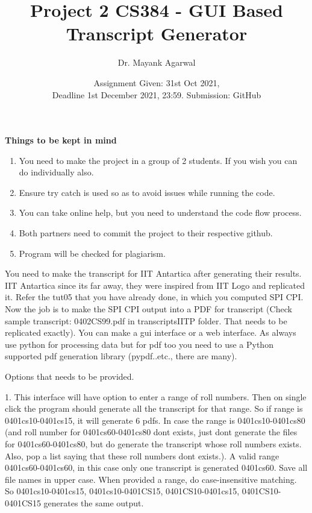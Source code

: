 \documentclass{article}
\title{Project 2 CS384 -   GUI Based Transcript Generator}
\author{Dr. Mayank Agarwal}
\date{Assignment Given: 31st Oct 2021,\\ Deadline 1st December 2021,  
23:59. Submission: GitHub }
\begin{document}
	\maketitle  
	\textbf{Things to be kept in mind} 
	\begin{enumerate}
\item You need to make the project in a group of 2 students. If you wish you 
can do individually also.  

\item Ensure try catch is used so as to avoid issues while running the code. 

\item You can take online help, but you need to understand the code flow 
process.

\item Both partners need to commit the project to their respective github. 
\item Program will be checked for plagiarism.   
\end{enumerate}


You need to make the transcript for IIT Antartica after generating their 
results.  IIT Antartica since its far away, they were inspired from IIT Logo 
and replicated it. Refer the tut05 that you have already done, in which you
computed SPI CPI. Now 
the job is to make the SPI CPI output into a PDF for transcript (Check sample 
transcript: 0402CS99.pdf in 	transcriptsIITP folder. That needs to be 
replicated exactly). You can make a 
gui interface or a web interface. As always use python for processing  data but 
for pdf too you need to use a Python supported pdf generation library 
(pypdf..etc., there are many).

Options that needs to be provided. 

1. This 
interface will have option to enter a range of roll numbers. Then on single 
click the program should generate  all the transcript for that range. So if 
range is 0401cs10-0401cs15, it will generate 6 pdfs. In case the range is 
0401cs10-0401cs80 (and roll number for 0401cs60-0401cs80 dont exists, just dont 
generate the files for 0401cs60-0401cs80, but do generate the transcript whose 
roll numbers exists. Also, pop a list saying that these roll numbers dont 
exists.). A valid range 0401cs60-0401cs60, in this case only one transcript is 
generated 0401cs60. Save all file names in upper case. When provided a range, 
do case-insensitive matching. So  0401cs10-0401cs15,  0401cs10-0401CS15,  
0401CS10-0401cs15,  0401CS10-0401CS15 generates the same output. 
\end{document}
